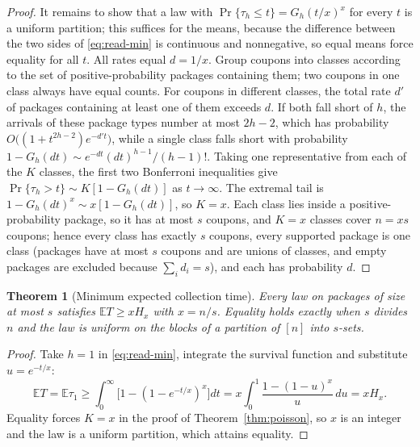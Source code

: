 \documentclass[11pt,a4paper]{article}
\newtheorem{theorem}{Theorem}[section]
\theoremstyle{remark}
\newcommand{\E}{\mathbb E}
\begin{document}
\begin{proof}
It remains to show that a law with $\Pr\{\tau_h\le t\}=G_h(t/x)^x$ for every $t$ is a uniform partition; this suffices for the means, because the difference between the two sides of \eqref{eq:read-min} is continuous and nonnegative, so equal means force equality for all $t$. All rates equal $d=1/x$. Group coupons into classes according to the set of positive-probability packages containing them; two coupons in one class always have equal counts. For coupons in different classes, the total rate $d'$ of packages containing at least one of them exceeds $d$. If both fall short of $h$, the arrivals of these package types number at most $2h-2$, which has probability $O\big((1+t^{2h-2})e^{-d't}\big)$, while a single class falls short with probability $1-G_h(dt)\sim e^{-dt}(dt)^{h-1}/(h-1)!$. Taking one representative from each of the $K$ classes, the first two Bonferroni inequalities give $\Pr\{\tau_h>t\}\sim K[1-G_h(dt)]$ as $t\to\infty$. The extremal tail is $1-G_h(dt)^x\sim x[1-G_h(dt)]$, so $K=x$. Each class lies inside a positive-probability package, so it has at most $s$ coupons, and $K=x$ classes cover $n=xs$ coupons; hence every class has exactly $s$ coupons, every supported package is one class (packages have at most $s$ coupons and are unions of classes, and empty packages are excluded because $\sum_id_i=s$), and each has probability $d$.
\end{proof}

\begin{theorem}[Minimum expected collection time]\label{thm:minimum}
Every law on packages of size at most $s$ satisfies $\E T\ge xH_x$ with $x=n/s$. Equality holds exactly when $s$ divides $n$ and the law is uniform on the blocks of a partition of $[n]$ into $s$-sets.
\end{theorem}
\begin{proof}
Take $h=1$ in \eqref{eq:read-min}, integrate the survival function and substitute $u=e^{-t/x}$:
\[
 \E T=\E\tau_1\ge\int_0^\infty\big[1-(1-e^{-t/x})^x\big]dt=x\int_0^1\frac{1-(1-u)^x}{u}\,du=xH_x .
\]
Equality forces $K=x$ in the proof of Theorem~\ref{thm:poisson}, so $x$ is an integer and the law is a uniform partition, which attains equality.
\end{proof}
\end{document}
